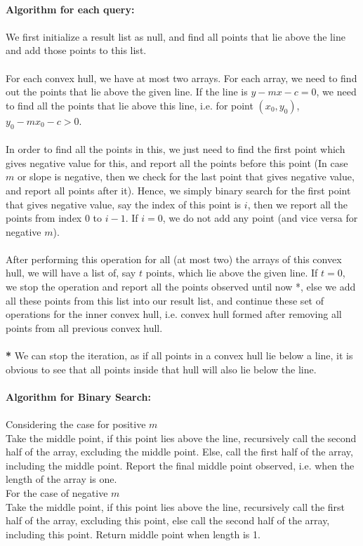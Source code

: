\documentclass{article}
\begin{document}
        \\
        \textbf{Algorithm for each query:}
        \\
        \\
        We first initialize a result list as null, and find all points that lie above the line and add those points to this list.
        \\
        \\
        For each convex hull, we have at most two arrays. For each array, we need to find out the points that lie above the given line. If the line is $y - mx - c = 0$, we need to find all the points that lie above this line, i.e. for point $(x_0, y_0)$, $y_0 - mx_0 -c > 0$.
        \\
        \\
        In order to find all the points in this, we just need to find the first point which gives negative value for this, and report all the points before this point (In case $m$ or slope is negative, then we check for the last point that gives negative value, and report all points after it). Hence, we simply binary search for the first point that gives negative value, say the index of this point is $i$, then we report all the points from index $0$ to $i - 1$. If $i = 0$, we do not add any point (and vice versa for negative $m$).
        \\
        \\
        After performing this operation for all (at most two) the arrays of this convex hull, we will have a list of, say $t$ points, which lie above the given line. If $t = 0$, we stop the operation and report all the points observed until now *, else we add all these points from this list into our result list, and continue these set of operations for the inner convex hull, i.e. convex hull formed after removing all points from all previous convex hull.
        \\
        \\
        \textbf{*} We can stop the iteration, as if all points in a convex hull lie below a line, it is obvious to see that all points inside that hull will also lie below the line.
        \\
        \\
        \textbf{Algorithm for Binary Search:}
        \\
        \\
        Considering the case for positive $m$
        \\
        Take the middle point, if this point lies above the line, recursively call the second half of the array, excluding the middle point. Else, call the first half of the array, including the middle point.
        Report the final middle point observed, i.e. when the length of the array is one.
        \\
        For the case of negative $m$
        \\
        Take the middle point, if this point lies above the line, recursively call the first half of the array, excluding this point, else call the second half of the array, including this point. Return middle point when length is 1.
\end{document}
